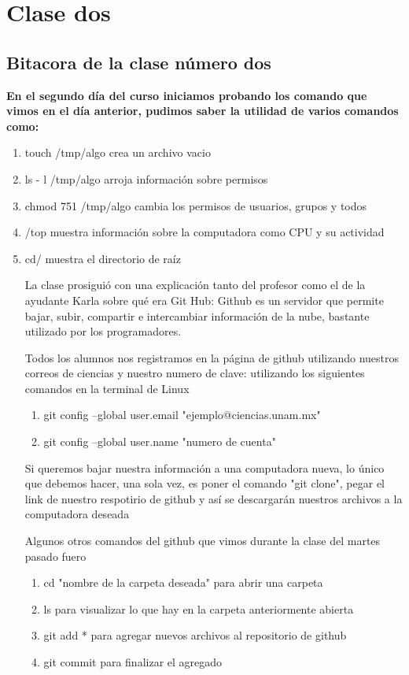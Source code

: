 \documentclass{book}
\begin{document}
\chapter{Clase dos}
\section{Bitacora de la clase número dos}
\textbf{En el segundo día del curso iniciamos probando los comando que vimos en el día anterior, pudimos saber la utilidad  de varios comandos como:}


\begin{enumerate}
	\item touch /tmp/algo crea un archivo vacio
	\item ls - l /tmp/algo arroja información sobre permisos
	\item chmod 751 /tmp/algo cambia los permisos de usuarios, grupos y todos
	\item /top muestra información sobre la computadora como CPU y su actividad
	\item cd/ muestra el directorio de raíz
	
	La clase prosiguió con una explicación tanto del profesor como el de la ayudante Karla sobre qué era Git Hub:
	Github es un servidor que permite bajar, subir, compartir e intercambiar información de la nube, bastante utilizado por los programadores.
	
	Todos los alumnos nos registramos en la página de github utilizando nuestros correos de ciencias y nuestro numero de clave: 
	utilizando los siguientes comandos en la terminal de Linux
	
	
	\begin{enumerate}
		\item git config --global user.email "ejemplo@ciencias.unam.mx"
		\item git config --global user.name "numero de cuenta"
		
	\end{enumerate}
	Si queremos bajar nuestra información a una computadora nueva, lo único que debemos hacer, una sola vez, es poner el comando "git clone", pegar el link de nuestro respotirio de github y así se descargarán nuestros archivos a la computadora deseada
	
	Algunos otros comandos del github que vimos durante la clase del martes pasado fuero
	
	\begin{enumerate}
		\item cd "nombre de la carpeta deseada" para abrir una carpeta
		\item ls para visualizar lo que hay en la carpeta anteriormente abierta
		\item git add * para agregar nuevos archivos al repositorio de github
		\item git commit para finalizar el agregado
		

\end{enumerate}
\end{enumerate}
\end{document}
